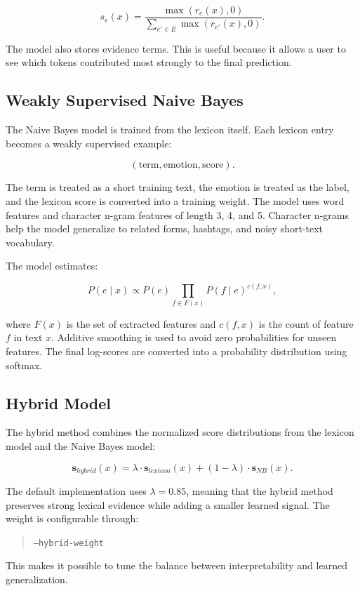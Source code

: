 \[
s_e(x) = \frac{\max(r_e(x), 0)}{\sum_{e' \in E} \max(r_{e'}(x), 0)}.
\]

The model also stores evidence terms. This is useful because it allows a user to see which tokens contributed most strongly to the final prediction.

\subsection{Weakly Supervised Naive Bayes}

The Naive Bayes model is trained from the lexicon itself. Each lexicon entry becomes a weakly supervised example:

\[
(\text{term}, \text{emotion}, \text{score}).
\]

The term is treated as a short training text, the emotion is treated as the label, and the lexicon score is converted into a training weight. The model uses word features and character n-gram features of length 3, 4, and 5. Character n-grams help the model generalize to related forms, hashtags, and noisy short-text vocabulary.

The model estimates:

\[
P(e \mid x) \propto P(e) \prod_{f \in F(x)} P(f \mid e)^{c(f,x)},
\]

where $F(x)$ is the set of extracted features and $c(f,x)$ is the count of feature $f$ in text $x$. Additive smoothing is used to avoid zero probabilities for unseen features. The final log-scores are converted into a probability distribution using softmax.

\subsection{Hybrid Model}

The hybrid method combines the normalized score distributions from the lexicon model and the Naive Bayes model:

\[
\mathbf{s}_{hybrid}(x) = \lambda \cdot \mathbf{s}_{lexicon}(x) + (1 - \lambda) \cdot \mathbf{s}_{NB}(x).
\]

The default implementation uses $\lambda = 0.85$, meaning that the hybrid method preserves strong lexical evidence while adding a smaller learned signal. The weight is configurable through:

\begin{quote}
\texttt{--hybrid-weight}
\end{quote}

This makes it possible to tune the balance between interpretability and learned generalization.
